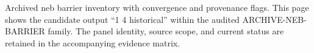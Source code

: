 Archived neb barrier inventory with convergence and provenance flags. This page shows the candidate output ``1 4 historical'' within the audited ARCHIVE-NEB-BARRIER family. The panel identity, source scope, and current status are retained in the accompanying evidence matrix.
